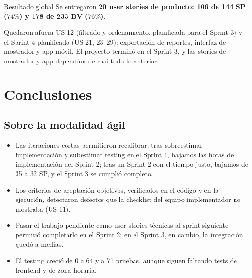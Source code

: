 \documentclass[11pt,a4paper]{article}
\begin{document}
\begin{destacado}{Resultado global}
Se entregaron \textbf{20 user stories de producto: 106 de 144 SP ($74\%$) y 178 de 233 BV ($76\%$)}.
\begin{center}
\end{center}
Quedaron afuera US-12 (filtrado y ordenamiento, planificada para el Sprint 3) y el Sprint 4 planificado (US-21, 23--29): exportación de reportes, interfaz de mostrador y app móvil. El proyecto terminó en el Sprint 3, y las stories de mostrador y app dependían de casi todo lo anterior.
\end{destacado}

\section{Conclusiones}

\subsection{Sobre la modalidad ágil}
\begin{itemize}
  \item Las iteraciones cortas permitieron recalibrar: tras sobreestimar implementación y subestimar testing en el Sprint 1, bajamos las horas de implementación del Sprint 2; tras un Sprint 2 con el tiempo justo, bajamos de 35 a 32 SP, y el Sprint 3 se cumplió completo.
  \item Los criterios de aceptación objetivos, verificados en el código y en la ejecución, detectaron defectos que la checklist del equipo implementador no mostraba (US-11).
  \item Pasar el trabajo pendiente como user stories técnicas al sprint siguiente permitió completarlo en el Sprint 2; en el Sprint 3, en cambio, la integración quedó a medias.
  \item El testing creció de 0 a 64 y a 71 pruebas, aunque siguen faltando tests de frontend y de zona horaria.
\end{itemize}
\end{document}
